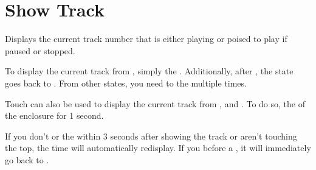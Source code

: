 \section{Show Track} \label{Show Track} 

Displays the current track number that is either playing or poised to play if
paused or stopped.


To display the current track from , simply  the .
Additionally, after , the state goes back to .
From other states, you need to  the  multiple times.


Touch can also be used to display the current track from , 
and .  To do so,  the  of the enclosure for
\num{1} second.



If you don't  or  the  within \num{3} seconds after
showing the track or aren't touching the top, the time will automatically
redisplay.  If you  before a ,
it will immediately go back to .


